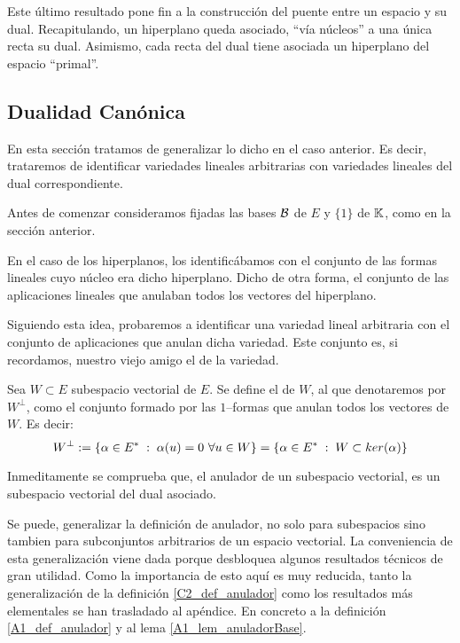 Este último resultado pone fin a la construcción del puente entre un espacio y su dual. Recapitulando, un hiperplano queda asociado, ``vía núcleos'' a una única recta su dual. Asimismo, cada recta del dual tiene asociada un hiperplano del espacio ``primal''.
\subsection{Dualidad Canónica}

En esta sección tratamos de generalizar lo dicho en el caso anterior. Es decir, trataremos de identificar variedades lineales arbitrarias con variedades lineales del dual correspondiente.

Antes de comenzar consideramos fijadas las bases $\mathcal{B}$ de $E$ y $\{1\}$ de $\mathbb{K}$, como en la sección anterior. 

En el caso de los hiperplanos, los identificábamos con el conjunto de las formas lineales cuyo núcleo era dicho hiperplano. Dicho de otra forma, el conjunto de las aplicaciones lineales que anulaban todos los vectores del hiperplano.

Siguiendo esta idea, probaremos a identificar una variedad lineal arbitraria con el conjunto de aplicaciones que anulan dicha variedad. Este conjunto es, si recordamos, nuestro viejo amigo el  de la variedad.

\begin{defi}
	\label{C2_def_anulador}
	Sea $W\subset E$ subespacio vectorial de $E$. Se define el  de $W$, al que denotaremos por $W^\perp$, como el conjunto formado por las $1$--formas que anulan todos los vectores de $W$. Es decir:
	\begin{equation}
	W^{\perp}:=\{\alpha\in E^*\;:\; \alpha(u)=0 \ \forall u\in W\}=\{\alpha\in E^*\;:\; W\subset ker(\alpha)\}
	\end{equation}
\end{defi}
Inmeditamente se comprueba que, el anulador de un subespacio vectorial, es un subespacio vectorial del dual asociado. 

\begin{obs}
	Se puede, generalizar la definición de anulador, no solo para subespacios sino tambien para subconjuntos arbitrarios de un espacio vectorial. La conveniencia de esta generalización viene dada porque desbloquea algunos resultados técnicos de gran utilidad. Como la importancia de esto aquí es muy reducida, tanto la generalización de la definición \ref{C2_def_anulador} como los resultados más elementales se han trasladado al apéndice. En concreto a la definición \ref{A1_def_anulador} y al lema \ref{A1_lem_anuladorBase}.
\end{obs}

